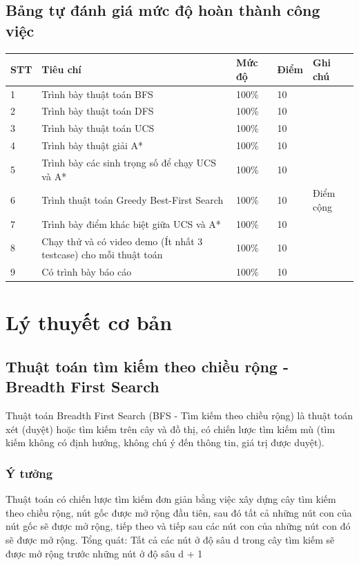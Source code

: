 \documentclass{article}
\newcommand{\ra}[1]{\renewcommand{\arraystretch}{#1}}
\begin{document}
\subsection{Bảng tự đánh giá mức độ hoàn thành công việc}

\begin{table}[h]\centering
\ra{1.3}
\begin{tabular}{lllll}\toprule
\textbf{STT} & \textbf{Tiêu chí} & \textbf{Mức độ} & \textbf{Điểm} & \textbf{Ghi chú} \\\midrule
1 & Trình bày thuật toán BFS & 100\% & 10 & \\
2 & Trình bày thuật toán DFS & 100\% & 10 & \\
3 & Trình bày thuật toán UCS & 100\% & 10 & \\
4 & Trình bày thuật giải A* & 100\% & 10 & \\
5 & Trình bày các sinh trọng số để chạy UCS và A* & 100\% & 10 & \\
6 & Trình thuật toán Greedy Best-First Search & 100\% & 10 & Điểm cộng\\
7 & Trình bày điểm khác biệt giữa UCS và A* & 100\% & 10 & \\
8 & Chạy thử và có video demo (Ít nhất 3 testcase) cho mỗi thuật toán & 100\% & 10 & \\
9 & Có trình bày báo cáo & 100\% & 10 & \\
\bottomrule
\end{tabular}
\end{table}

\newpage

\section{Lý thuyết cơ bản}

\subsection{Thuật toán tìm kiếm theo chiều rộng - Breadth First Search}

Thuật toán Breadth First Search (BFS - Tìm kiếm theo chiều rộng) là thuật toán xét (duyệt) hoặc tìm kiếm trên cây và đồ thị, có chiến lược tìm kiếm mù (tìm kiếm không có định hướng, không chú ý đến thông tin, giá trị được duyệt).\newline

\subsubsection{Ý tưởng}
Thuật toán có chiến lược tìm kiếm đơn giản bằng việc xây dựng cây tìm kiếm theo chiều rộng, nút gốc được mở rộng đầu tiên, sau đó tất cả những nút con của nút gốc sẽ được mở rộng, tiếp theo và tiếp sau các nút con của những nút con đó sẽ được mở rộng. \newline
Tổng quát: Tất cả các nút ở độ sâu d trong cây tìm kiếm sẽ được mở rộng trước những nút ở độ sâu d + 1
\end{document}

